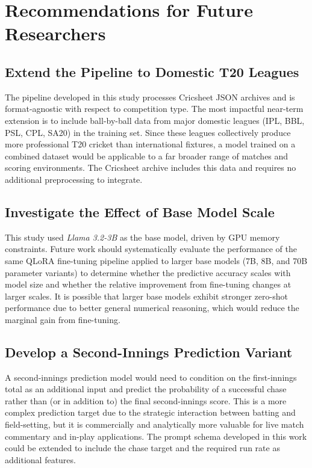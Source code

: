 \section{Recommendations for Future Researchers}

\subsection{Extend the Pipeline to Domestic T20 Leagues}

The pipeline developed in this study processes Cricsheet JSON archives and is format-agnostic with respect to competition type. The most impactful near-term extension is to include ball-by-ball data from major domestic leagues (IPL, BBL, PSL, CPL, SA20) in the training set. Since these leagues collectively produce more professional T20 cricket than international fixtures, a model trained on a combined dataset would be applicable to a far broader range of matches and scoring environments. The Cricsheet archive includes this data and requires no additional preprocessing to integrate.

\subsection{Investigate the Effect of Base Model Scale}

This study used \textit{Llama 3.2-3B} as the base model, driven by GPU memory constraints. Future work should systematically evaluate the performance of the same QLoRA fine-tuning pipeline applied to larger base models (7B, 8B, and 70B parameter variants) to determine whether the predictive accuracy scales with model size and whether the relative improvement from fine-tuning changes at larger scales. It is possible that larger base models exhibit stronger zero-shot performance due to better general numerical reasoning, which would reduce the marginal gain from fine-tuning.

\subsection{Develop a Second-Innings Prediction Variant}

A second-innings prediction model would need to condition on the first-innings total as an additional input and predict the probability of a successful chase rather than (or in addition to) the final second-innings score. This is a more complex prediction target due to the strategic interaction between batting and field-setting, but it is commercially and analytically more valuable for live match commentary and in-play applications. The prompt schema developed in this work could be extended to include the chase target and the required run rate as additional features.


